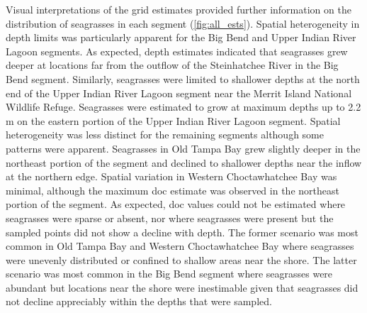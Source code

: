 \documentclass[letterpaper,12pt,oneside]{article}\usepackage[]{graphicx}\usepackage[]{color}
\begin{document}
Visual interpretations of the grid estimates provided further information on the distribution of seagrasses in each segment (\cref{fig:all_ests}).  Spatial heterogeneity in depth limits was particularly apparent for the Big Bend and Upper Indian River Lagoon segments.  As expected, depth estimates indicated that seagrasses grew deeper at locations far from the outflow of the Steinhatchee River in the Big Bend segment.  Similarly, seagrasses were limited to shallower depths at the north end of the Upper Indian River Lagoon segment near the Merrit Island National Wildlife Refuge. Seagrasses were estimated to grow at maximum depths up to 2.2 m on the eastern portion of the Upper Indian River Lagoon segment.  Spatial heterogeneity was less distinct for the remaining segments although some patterns were apparent.  Seagrasses in Old Tampa Bay grew slightly deeper in the northeast portion of the segment and declined to shallower depths near the inflow at the northern edge.  Spatial variation in Western Choctawhatchee Bay was minimal, although the maximum \ac{doc} estimate was observed in the northeast portion of the segment.  As expected, \ac{doc} values could not be estimated where seagrasses were sparse or absent, nor where seagrasses were present but the sampled points did not show a decline with depth.  The former scenario was most common in Old Tampa Bay and Western Choctawhatchee Bay where seagrasses were unevenly distributed or confined to shallow areas near the shore.  The latter scenario was most common in the Big Bend segment where seagrasses were abundant but locations near the shore were inestimable given that seagrasses did not decline appreciably within the depths that were sampled.   
\end{document}
